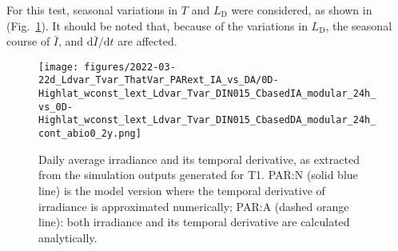 \documentclass[gmd, manuscript]{copernicus}
\newcommand{\onur}[1]{\textcolor{blue}{\{Onur: #1\}}}
\begin{document}
For this test, seasonal variations in $T$ and $L_{\text{D}}$ were considered, as shown in (Fig.~\ref{f.T2env}). It should be noted that, because of the variations in $L_{\text{D}}$, the seasonal course of $\bar{I}$, and $\text{d}\bar{I}/\text{d}t$ are affected.

\begin{figure}[ht!]
  \texttt{[image: figures/2022-03-22d\_Ldvar\_Tvar\_ThatVar\_PARext\_IA\_vs\_DA/0D-Highlat\_wconst\_lext\_Ldvar\_Tvar\_DIN015\_CbasedIA\_modular\_24h\_vs\_0D-Highlat\_wconst\_lext\_Ldvar\_Tvar\_DIN015\_CbasedDA\_modular\_24h\_cont\_abio0\_2y.png]}
  \caption{Daily average irradiance and its temporal derivative, as extracted from the simulation outputs generated for T1. PAR:N (solid blue line) is the model version where the temporal derivative of irradiance is approximated numerically; PAR:A (dashed orange line): both irradiance and its temporal derivative are calculated analytically.\label{f.T2env}}
\end{figure}
    

% 
\end{document}
